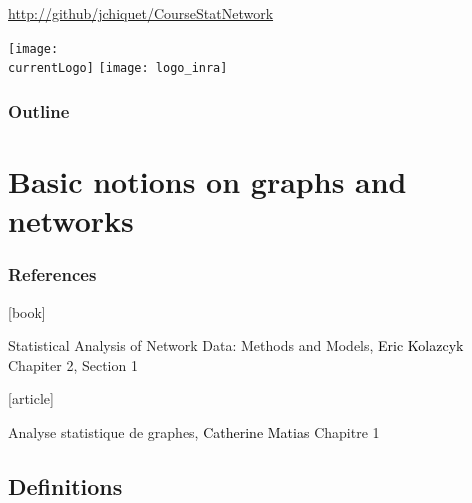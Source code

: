 \documentclass{beamer}\usepackage[]{graphicx}\usepackage[]{color}
\title{\currentCourse}
\subtitle{\huge\currentChapter\normalsize}
\institute{\currentInstitute}
\date{\currentDate}
\def\currentLogo{../common_figs/logo_ensai}
\newcommand{\dotitlepage}{%
  \begin{frame}
    \titlepage
    \vfill
    \begin{center}
        \scriptsize\url{http://github/jchiquet/CourseStatNetwork}
    \end{center}
    \vfill
    \texttt{[image: \\currentLogo]}\hfill
    \texttt{[image: logo\_inra]}
  \end{frame}
}
\begin{document}
\dotitlepage

\begin{frame}
  \frametitle{Outline}
  \tableofcontents
\end{frame}

\section{Basic notions on graphs and networks}

\begin{frame} 
  \frametitle{References}

    \begin{thebibliography}{99}
      [book]

     Statistical Analysis of Network Data: Methods and Models, 
    \newblock \textcolor{black}{Eric Kolazcyk} 
    \newblock \alert{Chapiter 2, Section 1}

      [article]

     Analyse statistique de graphes, 
    \newblock \textcolor{black}{Catherine Matias}
    \newblock \alert{Chapitre 1}    

    \end{thebibliography}

\end{frame}

\subsection{Definitions}
\end{document}
